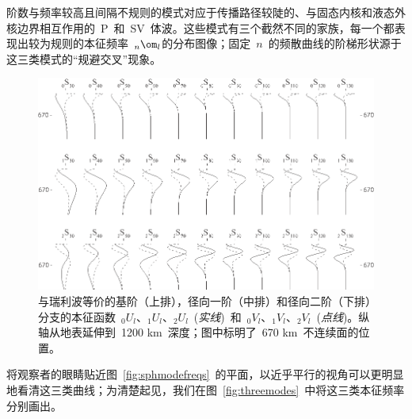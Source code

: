 {阶数与频率较高且间隔不规则的模式对应于传播路径较陡的、与固态内核和液态外核边界相互作用的~P~和~SV~体波。这些模式有三个截然不同的家族，每一个都表现出较为规则的本征频率~${}_n\om_l$的分布图像；固定~$n$~的频散曲线的阶梯形状源于这三类模式的“规避交叉”现象。
\begin{figure}[!t]
\begin{center}
\includegraphics{../figures/chap08/fig11.eps}
\end{center}
\caption[fundsphmodes]{\label{fig:fundsphmodes}
与瑞利波等价的基阶（上排），径向一阶（中排）和径向二阶（下排）分支的本征函数~${}_0U_l$、${}_1U_l$、${}_2U_l$~({\em 实线\/})~和~${}_0V_l$、${}_1V_l$、${}_2V_l$~({\em 点线\/})。纵轴从地表延伸到~1200 km~深度；图中标明了~670 km~不连续面的位置。
}
\end{figure}
将观察者的眼睛贴近图~\ref{fig:sphmodefreqs}~的平面，以近乎平行的视角可以更明显地看清这三类曲线；为清楚起见，我们在图~\ref{fig:threemodes}~中将这三类本征频率分别画出。
\begin{figure}
\centering
{}
{
}
\end{figure}}
